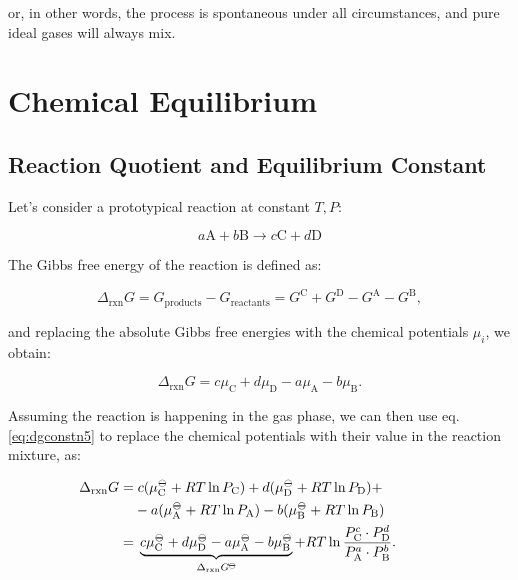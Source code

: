 \documentclass[
  9pt,
]{extbook}
\theoremstyle{definition}
\theoremstyle{definition}
\theoremstyle{definition}
\theoremstyle{remark}
\begin{document}
or, in other words, the process is spontaneous under all circumstances, and pure ideal gases will always mix.

\renewcommand*{\standardstate}{{-\kern-6pt{\ominus}\kern-6pt-}}

\hypertarget{ChemicalEquilibrium}{%
\chapter{Chemical Equilibrium}\label{ChemicalEquilibrium}}

\hypertarget{reaction-quotient-and-equilibrium-constant}{%
\section{Reaction Quotient and Equilibrium Constant}\label{reaction-quotient-and-equilibrium-constant}}

Let's consider a prototypical reaction at constant \(T,P\):

\begin{equation}
 a\mathrm{A} + b\mathrm{B} \rightarrow c\mathrm{C} + d\mathrm{D} 
\label{eq:reaction4}
\end{equation}

The Gibbs free energy of the reaction is defined as:

\begin{equation}
\Delta_{\text{rxn}} G = G_{\text{products}} - G_{\text{reactants}} = G^{\text{C}} + G^{\text{D}} - G^{\text{A}}-G^{\text{B}},
\label{eq:chemeq1}
\end{equation}

and replacing the absolute Gibbs free energies with the chemical potentials \(\mu_i\), we obtain:

\begin{equation}
\Delta_{\text{rxn}} G = c \mu_{\text{C}} + d \mu_{\text{D}} - a \mu_{\text{A}}- b\mu_{\text{B}}.
\label{eq:chemeq2}
\end{equation}

Assuming the reaction is happening in the gas phase, we can then use eq. \eqref{eq:dgconstn5} to replace the chemical potentials with their value in the reaction mixture, as:

\begin{equation}
\begin{aligned}
\mkern-60mu \Delta_{\text{rxn}} G =& \; c (\mu_{\text{C}}^{-\kern-6pt{\ominus}\kern-6pt-}+RT \ln P_{\text{C}}) + d (\mu_{\text{D}}^{-\kern-6pt{\ominus}\kern-6pt-}+RT \ln P_{\text{D}}) +\\ & - a (\mu_{\text{A}}^{-\kern-6pt{\ominus}\kern-6pt-}+RT \ln P_{\text{A}}) - b (\mu_{\text{B}}^{-\kern-6pt{\ominus}\kern-6pt-}+RT \ln P_{\text{B}}) \\
  =& \; \underbrace{c \mu_{\text{C}}^{-\kern-6pt{\ominus}\kern-6pt-}+ d \mu_{\text{D}}^{-\kern-6pt{\ominus}\kern-6pt-}- a \mu_{\text{A}}^{-\kern-6pt{\ominus}\kern-6pt-}- b\mu_{\text{B}}^{-\kern-6pt{\ominus}\kern-6pt-}}_{\Delta_{\text{rxn}} G^{-\kern-6pt{\ominus}\kern-6pt-}}  +RT \ln \frac{P_{\text{C}}^c \cdot P_{\text{D}}^d}{P_{\text{A}}^a \cdot P_{\text{B}}^b}.
\end{aligned}
\label{eq:chemeq3}
\end{equation}
\end{document}
